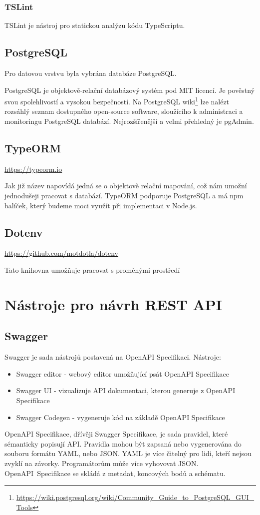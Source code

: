 \documentclass[thesis=B,czech]{FITthesis}[2012/06/26]
\begin{document}
        \subsubsection{TSLint}
            TSLint je nástroj pro statickou analýzu kódu TypeScriptu.
        \subsection{PostgreSQL}
            Pro datovou vrstvu byla vybrána databáze PostgreSQL.
            
            PostgreSQL je objektově-relační databázový systém pod MIT licencí. Je pověstný svou spolehlivostí a vysokou bezpečností. Na PostgreSQL wiki\footnote{\url{https://wiki.postgresql.org/wiki/Community_Guide_to_PostgreSQL_GUI_Tools}} lze nalézt rozsáhlý seznam dostupného open-source software, sloužícího k administraci a monitoringu PostgreSQL databází. Nejrozšířenější a velmi přehledný je pgAdmin.
        \subsection{TypeORM}
            \url{https://typeorm.io}
        
        
            Jak již název napovídá jedná se o objektově relační mapování, což nám umožní jednodušeji pracovat s databází. TypeORM podporuje PostgreSQL a má npm balíček, který budeme moci využít při implementaci v Node.js.
            
        \subsection{Dotenv}
            \url{https://github.com/motdotla/dotenv}
            
            Tato knihovna umožňuje pracovat s proměnými prostředí
    \section{Nástroje pro návrh REST API}
        \subsection{Swagger}
            Swagger je sada nástrojů postavená na OpenAPI Specifikaci.
            \newline Nástroje:
            \begin{itemize}
                \item Swagger editor - webový editor umožňující psát OpenAPI Specifikace
                \item Swagger UI - vizualizuje API dokumentaci, kterou generuje z OpenAPI Specifikace
                \item Swagger Codegen - vygeneruje kód na základě OpenAPI Specifikace
            \end{itemize}
            OpenAPI Specifikace, dřívěji Swagger Specifikace, je sada pravidel, které sémanticky popisují API. Pravidla mohou být zapsaná nebo vygenerována do souboru formátu YAML, nebo JSON. YAML je více čitelný pro lidi, kteří nejsou zvyklí na závorky. Programátorům může více vyhovovat JSON. OpenAPI~Specifikace se skládá z metadat, koncových bodů a schématu.
\end{document}
